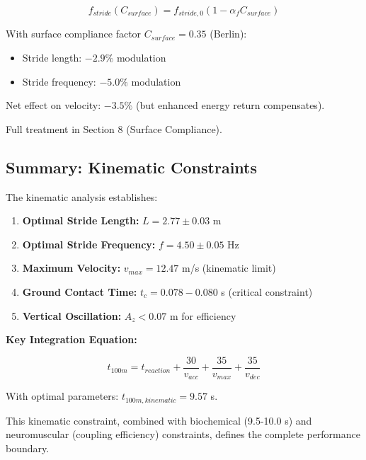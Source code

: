 \begin{equation}
f_{stride}(C_{surface}) = f_{stride,0} (1 - \alpha_f C_{surface})
\label{eq:frequency_surface_coupling}
\end{equation}

With surface compliance factor $C_{surface} = 0.35$ (Berlin):
\begin{itemize}
\item Stride length: $-2.9\%$ modulation
\item Stride frequency: $-5.0\%$ modulation
\end{itemize}

Net effect on velocity: $-3.5\%$ (but enhanced energy return compensates).

Full treatment in Section 8 (Surface Compliance).

\subsection{Summary: Kinematic Constraints}

The kinematic analysis establishes:

\begin{enumerate}
\item \textbf{Optimal Stride Length:} $L = 2.77 \pm 0.03$ m
\item \textbf{Optimal Stride Frequency:} $f = 4.50 \pm 0.05$ Hz
\item \textbf{Maximum Velocity:} $v_{max} = 12.47$ m/s (kinematic limit)
\item \textbf{Ground Contact Time:} $t_c = 0.078-0.080$ s (critical constraint)
\item \textbf{Vertical Oscillation:} $A_z < 0.07$ m for efficiency
\end{enumerate}

\textbf{Key Integration Equation:}

\begin{equation}
\boxed{t_{100m} = t_{reaction} + \frac{30}{v_{acc}} + \frac{35}{v_{max}} + \frac{35}{v_{dec}}}
\label{eq:kinematic_time_formula}
\end{equation}

With optimal parameters: $t_{100m,kinematic} = 9.57$ s.

This kinematic constraint, combined with biochemical (9.5-10.0 s) and neuromuscular (coupling efficiency) constraints, defines the complete performance boundary.

